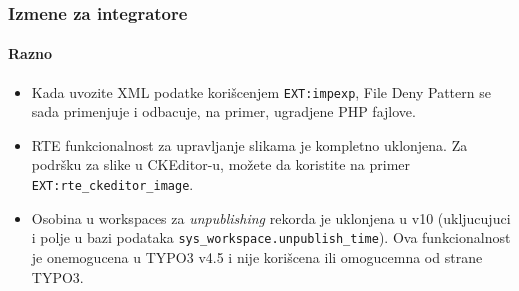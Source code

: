 
\begin{frame}[fragile]
	\frametitle{Izmene za integratore}
	\framesubtitle{Razno}

	\lstset{basicstyle=\tiny\ttfamily}

	\begin{itemize}

		\item Kada uvozite XML podatke korišcenjem \texttt{EXT:impexp}, File Deny Pattern se sada primenjuje
			i odbacuje, na primer, ugradjene PHP fajlove.


		\item RTE funkcionalnost za upravljanje slikama je kompletno uklonjena.
			Za podršku za slike u CKEditor-u, možete da koristite na primer \texttt{EXT:rte\_ckeditor\_image}.

		\item Osobina u workspaces za \textit{unpublishing} rekorda je uklonjena u v10
			(ukljucujuci i polje u bazi podataka \texttt{sys\_workspace.unpublish\_time}).
			Ova funkcionalnost je onemogucena u TYPO3 v4.5 i nije korišcena ili omogucemna od strane TYPO3.

	\end{itemize}

\end{frame}


